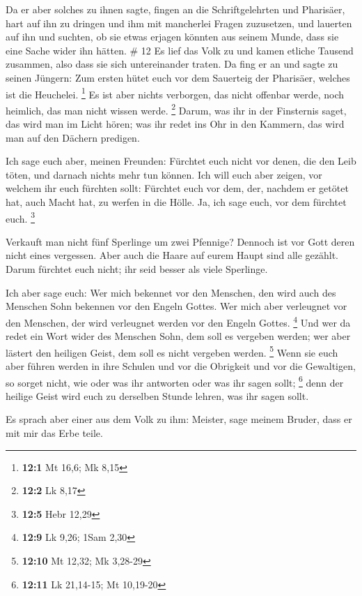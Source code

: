  Da er aber solches zu ihnen sagte, fingen an die
Schriftgelehrten und Pharisäer, hart auf ihn zu dringen und ihm mit
mancherlei Fragen zuzusetzen,  und lauerten auf ihn und
suchten, ob sie etwas erjagen könnten aus seinem Munde, dass sie eine
Sache wider ihn hätten. \# 12  Es lief das Volk zu und kamen
etliche Tausend zusammen, also dass sie sich untereinander traten. Da
fing er an und sagte zu seinen Jüngern: Zum ersten hütet euch vor dem
Sauerteig der Pharisäer, welches ist die Heuchelei. \footnote{\textbf{12:1}
  Mt 16,6; Mk 8,15}  Es ist aber nichts verborgen, das nicht
offenbar werde, noch heimlich, das man nicht wissen werde. \footnote{\textbf{12:2}
  Lk 8,17}  Darum, was ihr in der Finsternis saget, das wird
man im Licht hören; was ihr redet ins Ohr in den Kammern, das wird man
auf den Dächern predigen.

 Ich sage euch aber, meinen Freunden: Fürchtet euch nicht
vor denen, die den Leib töten, und darnach nichts mehr tun können.
 Ich will euch aber zeigen, vor welchem ihr euch fürchten
sollt: Fürchtet euch vor dem, der, nachdem er getötet hat, auch Macht
hat, zu werfen in die Hölle. Ja, ich sage euch, vor dem fürchtet euch.
\footnote{\textbf{12:5} Hebr 12,29}

 Verkauft man nicht fünf Sperlinge um zwei Pfennige? Dennoch
ist vor Gott deren nicht eines vergessen.  Aber auch die
Haare auf eurem Haupt sind alle gezählt. Darum fürchtet euch nicht; ihr
seid besser als viele Sperlinge.

 Ich aber sage euch: Wer mich bekennet vor den Menschen, den
wird auch des Menschen Sohn bekennen vor den Engeln Gottes. 
Wer mich aber verleugnet vor den Menschen, der wird verleugnet werden
vor den Engeln Gottes. \footnote{\textbf{12:9} Lk 9,26; 1Sam 2,30}
 Und wer da redet ein Wort wider des Menschen Sohn, dem
soll es vergeben werden; wer aber lästert den heiligen Geist, dem soll
es nicht vergeben werden. \footnote{\textbf{12:10} Mt 12,32; Mk 3,28-29}
 Wenn sie euch aber führen werden in ihre Schulen und vor
die Obrigkeit und vor die Gewaltigen, so sorget nicht, wie oder was ihr
antworten oder was ihr sagen sollt; \footnote{\textbf{12:11} Lk
  21,14-15; Mt 10,19-20}  denn der heilige Geist wird euch
zu derselben Stunde lehren, was ihr sagen sollt.

 Es sprach aber einer aus dem Volk zu ihm: Meister, sage
meinem Bruder, dass er mit mir das Erbe teile.

